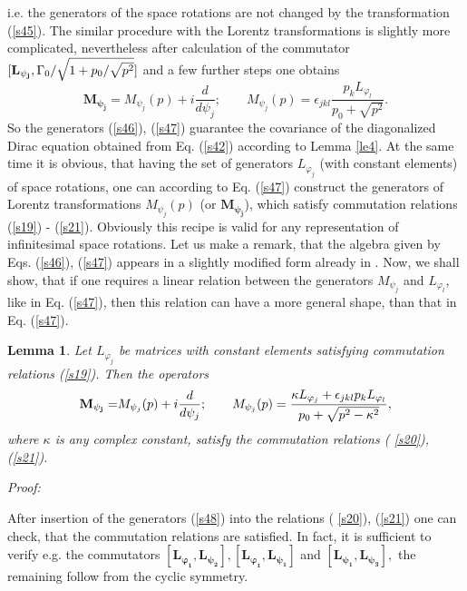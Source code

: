 \documentclass[a4paper,a4paper]{article}
\newtheorem{lemma}[theorem]{Lemma}
\begin{document}
i.e. the generators of the space rotations are not changed by the
transformation (\ref{s45}). The similar procedure with the Lorentz
transformations is slightly more complicated, nevertheless after calculation
of the commutator $[\mathbf{L_{\psi _{j}}},\Gamma _{0}/\sqrt{1+p_{0}/\sqrt{%
p^{2}}}]$ and a few further steps one obtains 
\begin{equation}
\mathbf{M_{\psi _{j}}=}M_{\psi _{j}}(p)+i\frac{d}{d\psi _{j}};\qquad M_{\psi
_{j}}(p)=\epsilon _{jkl}\frac{p_{k}L_{\varphi _{l}}}{p_{0}+\sqrt{p^{2}}}.
\label{s47}
\end{equation}%
So the generators (\ref{s46}), (\ref{s47}) guarantee the covariance of the
diagonalized Dirac equation obtained from Eq. (\ref{s42}) according to Lemma %
\ref{le4}. At the same time it is obvious, that having the set of generators 
$L_{\varphi _{j}}$ (with constant elements) of space rotations, one can
according to Eq. (\ref{s47}) construct the generators of Lorentz
transformations $M_{\psi _{j}}(p)$ (or $\mathbf{M_{\psi _{j}}}$), which
satisfy commutation relations (\ref{s19}) - (\ref{s21}). Obviously this
recipe is valid for any representation of infinitesimal space rotations. Let
us make a remark, that the algebra given by Eqs. (\ref{s46}), (\ref{s47})
appears in a slightly modified form already in \cite{foldy56}. Now, we shall
show, that if one requires a linear relation between the generators $M_{\psi
_{j}}$ and $L_{\varphi _{l}}$, like in Eq. (\ref{s47}), then this relation
can have a more general shape, than that in Eq. (\ref{s47}).

\begin{lemma}
\label{le5}Let $L_{\varphi _{j}}$ be matrices with constant elements
satisfying commutation relations (\ref{s19}). Then the operators 
\begin{equation}
\mathbf{M_{\psi _{j}}=}M_{\psi _{j}}(p)+i\frac{d}{d\psi _{j}};\qquad M_{\psi
_{j}}(p)=\frac{\kappa L_{\varphi _{j}}+\epsilon _{jkl}p_{k}L_{\varphi _{l}}}{%
p_{0}+\sqrt{p^{2}-\kappa ^{2}}},  \label{s48}
\end{equation}%
where $\kappa $ is any complex constant, satisfy the commutation relations (%
\ref{s20}), (\ref{s21}).
\end{lemma}

\noindent \textit{Proof:}

\noindent After insertion of the generators (\ref{s48}) into the relations (%
\ref{s20}), (\ref{s21}) one can check, that the commutation relations are
satisfied. In fact, it is sufficient to verify e.g. the commutators $[%
\mathbf{L_{\varphi _{1}}},\mathbf{L_{\psi _{2}}}],[\mathbf{L_{\varphi _{1}}},%
\mathbf{L_{\psi _{1}}}]$ and $[\mathbf{L_{\psi _{1}}},\mathbf{L_{\psi _{3}}}%
],$ the remaining follow from the cyclic symmetry.
\end{document}
